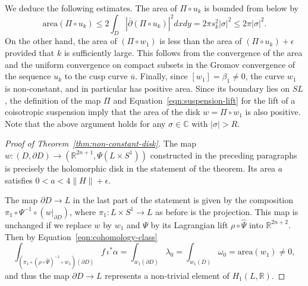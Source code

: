 \documentclass{amsart}
\theoremstyle{remark}
\def\area{{\textrm{area}}}
\def\C{{\mathbb C}}
\def\p{{\partial}}
\def\pbar{{\overline{\partial}}}
\def\R{{\mathbb R}}
\begin{document}
We deduce the following estimates.
The area of $\Pi \circ u_k$ is bounded from below by
\[ \area (\Pi \circ u_k) \le 2 \int_D | \pbar (\Pi \circ u_k) |^2 dx dy = 2 \pi s_k^2 | \sigma |^2 \le 2 \pi | \sigma |^2. \]
On the other hand, the area of $(\Pi \circ w_1)$ is less than the area of $(\Pi \circ u_k) + \epsilon$ provided that $k$ is sufficiently large.
This follows from the convergence of the area and the uniform convergence on compact subsets in the Gromov convergence of the sequence $u_k$ to the cusp curve $\overline{u}$.
Finally, since $[ w_1 ] = \beta_1 \not= 0$, the curve $w_1$ is non-constant, and in particular has positive area.
Since its boundary lies on $SL$, the definition of the map $\Pi$ and Equation~\ref{eqn:suspension-lift} for the lift of a coisotropic suspension imply that the area of the disk $w = \Pi \circ w_1$ is also positive.
Note that the above argument holds for any $\sigma \in \C$ with $| \sigma | > R$.

\begin{proof}[Proof of Theorem~\ref{thm:non-constant-disk}]
The map $w \colon (D, \p D) \to (\R^{2 n + 1}, \Psi (L \times S^1))$ constructed in the preceding paragraphs is precisely the holomorphic disk in the statement of the theorem.
Its area $a$ satisfies $0 < a < 4 \| H \| + \epsilon$.

The map $\p D \to L$ in the last part of the statement is given by the composition $\pi_1 \circ \Psi^{-1} \circ (w |_{\p D})$, where $\pi_1 \colon L \times S^1 \to L$ as before is the projection.
This map is unchanged if we replace $w$ by $w_1$ and $\Psi$ by its Lagrangian lift $\rho \circ \widehat{\Psi}$ into $\R^{2 n + 2}$.
Then by Equation~\ref{eqn:cohomology-class}
\[ \int_{(\pi_1 \circ (\rho \circ \widehat{\Psi})^{-1} \circ w_1) (\p D)} f \, \iota^* \alpha = \int_{w_1 (\p D)} \lambda_0 = \int_{w_1 (D)} \omega_0 = \area (w_1) \not= 0, \]
and thus the map $\p D \to L$ represents a non-trivial element of $H_1 (L, \R)$.
\end{proof}
\end{document}
